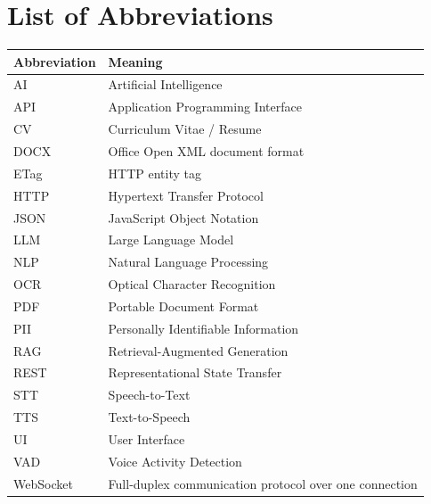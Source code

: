 \chapter*{List of Abbreviations}

\begin{longtable}{p{}p{}}
\toprule Abbreviation & Meaning\\ \midrule\endhead
AI & Artificial Intelligence\\
API & Application Programming Interface\\
CV & Curriculum Vitae / Resume\\
DOCX & Office Open XML document format\\
ETag & HTTP entity tag\\
HTTP & Hypertext Transfer Protocol\\
JSON & JavaScript Object Notation\\
LLM & Large Language Model\\
NLP & Natural Language Processing\\
OCR & Optical Character Recognition\\
PDF & Portable Document Format\\
PII & Personally Identifiable Information\\
RAG & Retrieval-Augmented Generation\\
REST & Representational State Transfer\\
STT & Speech-to-Text\\
TTS & Text-to-Speech\\
UI & User Interface\\
VAD & Voice Activity Detection\\
WebSocket & Full-duplex communication protocol over one connection\\
\bottomrule
\end{longtable}
